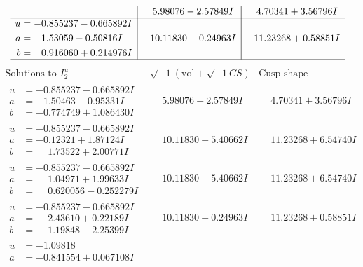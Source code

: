 \documentclass[1p]{elsarticle_modified}
\theoremstyle{definition}
\newcommand{\I}{\sqrt{-1}}
\begin{document}
$$\begin{array}{c|c|c}
 & \phantom{-}5.98076 - 2.57849 I & \phantom{-}4.70341 + 3.56796 I \\ \hline\begin{aligned}
u &= -0.855237 - 0.665892 I \\
a &= \phantom{-}1.53059 - 0.50816 I \\
b &= \phantom{-}0.916060 + 0.214976 I\end{aligned}
 & \phantom{-}10.11830 + 0.24963 I & \phantom{-}11.23268 + 0.58851 I\\
 \hline 
 \end{array}$$\newpage$$\begin{array}{c|c|c}  
\text{Solutions to }I^u_{2}& \I (\text{vol} + \sqrt{-1}CS) & \text{Cusp shape}\\
 \hline 
\begin{aligned}
u &= -0.855237 - 0.665892 I \\
a &= -1.50463 - 0.95331 I \\
b &= -0.774749 + 1.086430 I\end{aligned}
 & \phantom{-}5.98076 - 2.57849 I & \phantom{-}4.70341 + 3.56796 I \\ \hline\begin{aligned}
u &= -0.855237 - 0.665892 I \\
a &= -0.12321 + 1.87124 I \\
b &= \phantom{-}1.73522 + 2.00771 I\end{aligned}
 & \phantom{-}10.11830 - 5.40662 I & \phantom{-}11.23268 + 6.54740 I \\ \hline\begin{aligned}
u &= -0.855237 - 0.665892 I \\
a &= \phantom{-}1.04971 + 1.99633 I \\
b &= \phantom{-}0.620056 - 0.252279 I\end{aligned}
 & \phantom{-}10.11830 - 5.40662 I & \phantom{-}11.23268 + 6.54740 I \\ \hline\begin{aligned}
u &= -0.855237 - 0.665892 I \\
a &= \phantom{-}2.43610 + 0.22189 I \\
b &= \phantom{-}1.19848 - 2.25399 I\end{aligned}
 & \phantom{-}10.11830 + 0.24963 I & \phantom{-}11.23268 + 0.58851 I \\ \hline\begin{aligned}
u &= -1.09818\phantom{ +0.000000I} \\
a &= -0.841554 + 0.067108 I \\

\end{aligned}
\end{array}$$
\end{document}
